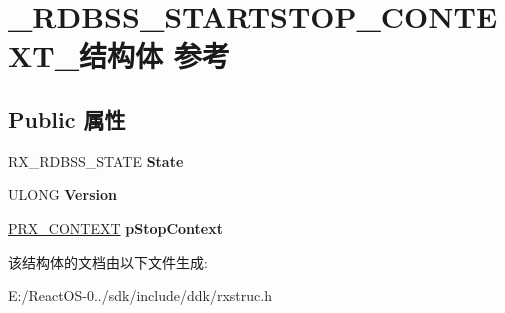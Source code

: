 \hypertarget{struct___r_d_b_s_s___s_t_a_r_t_s_t_o_p___c_o_n_t_e_x_t__}{}\section{\+\_\+\+R\+D\+B\+S\+S\+\_\+\+S\+T\+A\+R\+T\+S\+T\+O\+P\+\_\+\+C\+O\+N\+T\+E\+X\+T\+\_\+结构体 参考}
\label{struct___r_d_b_s_s___s_t_a_r_t_s_t_o_p___c_o_n_t_e_x_t__}
\subsection*{Public 属性}
\begin{DoxyCompactItemize}
\item 
\mbox{\label{struct___r_d_b_s_s___s_t_a_r_t_s_t_o_p___c_o_n_t_e_x_t___aeb3f1d43e979811c0757a2f71438c5d3}} 
R\+X\+\_\+\+R\+D\+B\+S\+S\+\_\+\+S\+T\+A\+TE {\bfseries State}
\item 
\mbox{\label{struct___r_d_b_s_s___s_t_a_r_t_s_t_o_p___c_o_n_t_e_x_t___a1181d02fb94acb90cf1da9e5029f7b83}} 
U\+L\+O\+NG {\bfseries Version}
\item 
\mbox{\label{struct___r_d_b_s_s___s_t_a_r_t_s_t_o_p___c_o_n_t_e_x_t___a9d3b0ad333e4995cc6a53523e1dcdb6d}} 
\hyperlink{struct___r_x___c_o_n_t_e_x_t}{P\+R\+X\+\_\+\+C\+O\+N\+T\+E\+XT} {\bfseries p\+Stop\+Context}
\end{DoxyCompactItemize}


该结构体的文档由以下文件生成\+:\begin{DoxyCompactItemize}
\item 
E\+:/\+React\+O\+S-\/0../sdk/include/ddk/rxstruc.\+h\end{DoxyCompactItemize}
